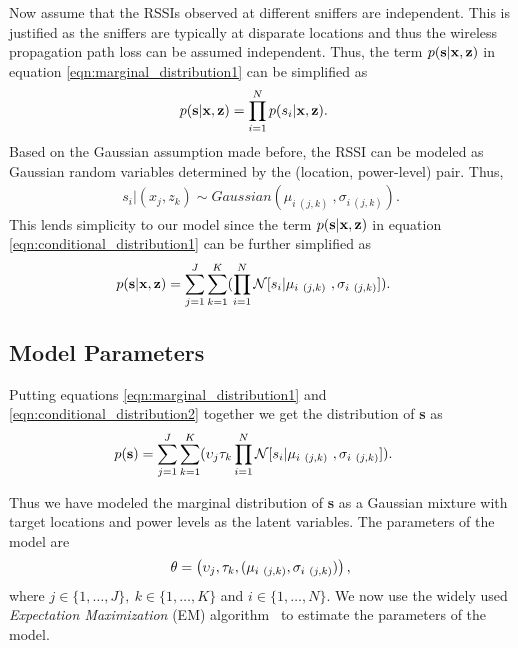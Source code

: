
Now assume that the RSSIs observed at different sniffers are independent. This is justified as the sniffers are typically at disparate locations and thus the wireless propagation path loss can be assumed independent. 
Thus, the term $p( {\bf s} | {\bf x}, {\bf z})$ in equation
\ref{eqn:marginal_distribution1} can be simplified as
\begin{align}
p( {\bf s} | {\bf x}, {\bf z}) & = \prod_{i=1}^N p({s_{i}}|{\bf x}, {\bf
		z}). \label{eqn:conditional_distribution1}
\end{align}
Based on the Gaussian assumption made before, the RSSI can be modeled 
as Gaussian random variables determined by the (location, power-level) pair. Thus,
\begin{align}
s_{i} | ({x_{j}}, {z_{k}})  \sim  Gaussian (\mu_{i \ (j,k)} \ , \sigma_{i \ (j,k)}).
\end{align}
This lends simplicity to our model since the term $p( {\bf s} | {\bf x}, {\bf z})$ in equation
\ref{eqn:conditional_distribution1} can be further simplified as 
\begin{align}
p( {\bf s} | {\bf x}, {\bf z}) & =  \sum_{j=1}^J \sum_{k=1}^K (
		\prod_{i=1}^N {\it \mathcal  N}[ {s_{i}} | \mu_{i \ (j,k)} \ ,
		\sigma_{i \ (j,k)}] ). \label{eqn:conditional_distribution2}
\end{align}

\subsection{Model Parameters}
\label{subsec:modelparameters}

Putting equations \ref{eqn:marginal_distribution1} and
\ref{eqn:conditional_distribution2} together we get the distribution of
{\bf s} as
\begin{align}
p( {\bf s}) &= \sum_{j=1}^J \sum_{k=1}^K ( \upsilon_{j} \tau_{k} \prod_{i=1}^N {\it \mathcal  N}[ {s_{i}} | \mu_{i \ (j,k)} \ ,
		\sigma_{i \ (j,k)}] ).
\end{align}

Thus we have modeled the marginal distribution of {\bf s} as a Gaussian
mixture with target locations and power levels as the latent variables. The parameters of the model are 
\begin{align}
{\bf \theta} = \left( \upsilon_{j} , \tau_{k}, (\mu_{i \ (j,k)} , \sigma_{i \ (j,k)} )\right),
\end{align}
where $j\in\{1,\ldots,J\},\ k \in\{1,\ldots,K\}$ and $i\in \{1,\ldots,N\}$. We now use the  widely used \emph{Expectation Maximization} (EM) algorithm~\cite{Dempster77maximumlikelihood, Borman_theexpectation, Bilmes97agentle, DinovIvoD, Bishop:2006:PRM:1162264} to estimate the parameters of the model.
